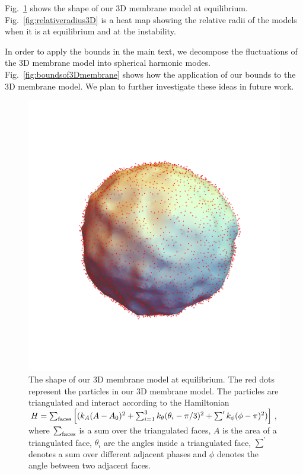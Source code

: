 \documentclass[amsmath,preprintnumbers,10pt,nofootinbib,prl,twocolumn]{revtex4-1}
\begin{document}
Fig.~\ref{fig:3Dmembranesurface} shows the shape of our 3D membrane model at equilibrium. Fig.~\ref{fig:relativeradius3D} is a heat map showing the relative radii of the models when it is at equilibrium and at the instability.

In order to apply the bounds in the main text, we decompose the fluctuations of the 3D membrane model into spherical harmonic modes. Fig.~\ref{fig:boundsof3Dmembrane} shows how the application of our bounds to the 3D membrane model. We plan to further investigate these ideas in future work. 

\begin{figure}
\includegraphics[width=1\linewidth,angle=0]{Fig10.pdf}
\caption{ The shape of our 3D membrane model at equilibrium. The red dots represent the particles in our 3D membrane model. The particles are triangulated and interact according to the Hamiltonian $H=\sum_{\rm faces}\left[ (k_A(A-A_0)^2 +\sum_{i=1}^3 k_\theta (\theta_i-\pi/3)^2 + \sum^\prime k_\phi (\phi-\pi)^2)\right]$, where $\sum_{\rm faces}$ is a sum over the triangulated faces, $A$ is the area of a triangulated face, $\theta_i$ are the angles inside a triangulated face,  $\sum^\prime$ denotes a sum over different adjacent phases and $\phi$ denotes the angle between two adjacent faces.}
\label{fig:3Dmembranesurface}
\end{figure}
\end{document}
